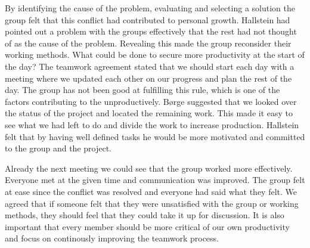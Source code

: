 By identifying the cause of the problem, evaluating and selecting a solution the group felt that this conflict had contributed to personal growth. Hallstein had pointed out a problem with the groups effectively that the rest had not thought of as the cause of the problem. Revealing this made the group reconsider their working methods. What could be done to secure more productivity at the start of the day? The teamwork agreement stated that we should start each day with a meeting where we updated each other on our progress and plan the rest of the day. The group has not been good at fulfilling this rule, which is one of the factors contributing to the unproductively. Børge suggested that we looked over the status of the project and located the remaining work. This made it easy to see what we had left to do and divide the work to increase production. Hallstein felt that by having well defined tasks he would be more motivated and committed to the group and the project.  

Already the next meeting we could see that the group worked more effectively. Everyone met at the given time and communication was improved. The group felt at ease since the conflict was resolved and everyone had said what they felt. We agreed that if someone felt that they were unsatisfied with the group or working methods, they should feel that they could take it up for discussion. It is also important that every member should be more critical of our own productivity and focus on continously improving the teamwork process.  
